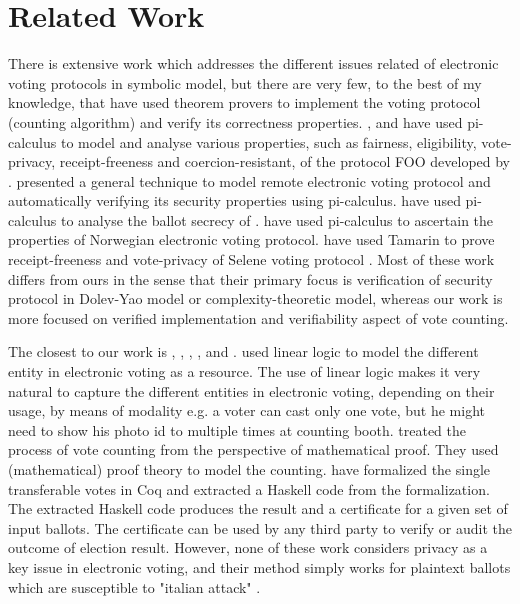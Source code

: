 \section{Related Work}
 There is extensive work which 
 addresses the different issues related of electronic voting protocols  in symbolic model, 
 but there are very few, to the best of my knowledge, 
 that have used theorem provers to implement the voting protocol (counting algorithm)
 and verify its correctness properties. 
 \cite{10.1007/978-3-540-31987-0_14}, and  \cite{Delaune2010} have used pi-calculus to model 
 and analyse various properties, such as fairness, eligibility, vote-privacy, receipt-freeness and 
 coercion-resistant,  
 of the protocol FOO developed by \cite{10.1007/3-540-57220-1_66}.  \cite{Backes:2008:AVR:1380848.1381255}
 presented a general technique to model  remote electronic 
 voting protocol and automatically verifying  its security properties using pi-calculus. 
 \cite{5992139} have used pi-calculus to analyse the ballot secrecy of \cite{Helios:2016:HVS}.
 \cite{10.1007/978-3-642-28641-4_7} have used pi-calculus to ascertain the properties of 
 Norwegian electronic voting protocol.
 \cite{10.1007/978-3-319-68687-5_7} have used Tamarin  to prove receipt-freeness 
 and vote-privacy of Selene voting protocol \citep{Selene}.  Most of these work differs from ours
 in the sense that their primary focus is verification of security protocol in  
 Dolev-Yao model or  complexity-theoretic model, whereas our work is 
 more focused on verified implementation and  verifiability  aspect of vote counting.

 The closest to our work is \cite{DeYoung:2012:LLV}, \cite{Pattinson:2015:VCM}, \cite{Pattinson:2016:MSP},
 \cite{Verity:2017:FVI:3014812.3014845}, and \cite{Ghale:2017:FVS}.  \cite{DeYoung:2012:LLV} 
 used linear logic\citep{GIRARD19871} to model the different entity in electronic voting as a resource. 
 The use of linear logic makes it very natural to capture the different entities in electronic voting,  
 depending on their usage, by means of modality e.g. a voter can cast only one vote, but he might 
 need to show his photo id to multiple times at counting booth. \cite{Pattinson:2015:VCM} treated 
 the process of vote counting from
 the perspective of mathematical proof. They used (mathematical) proof theory to model the 
 counting. \cite{Ghale:2017:FVS} have formalized the single transferable votes in Coq and 
 extracted a Haskell code from the formalization. The extracted Haskell code produces the result 
 and a certificate for a given set of input ballots. The certificate can be used by any third party to verify 
 or audit the outcome of election result.  However, none of these work considers privacy as a key 
 issue in electronic voting, and their method simply works for plaintext ballots which are  susceptible to 
 "italian attack"  \citep{Otten}   \citep{Benaloh:2009:SSC}.

